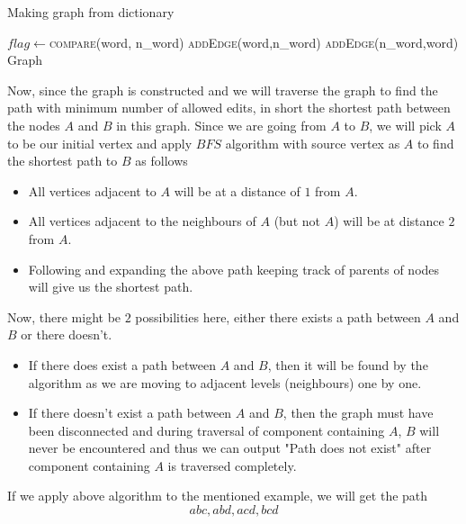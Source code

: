 \documentclass{article}
\begin{document}
{\begin{algorithm}
    \caption{Making graph from dictionary}
    \begin{algorithmic}[1]
            \State $flag \gets$\textsc{compare}(word, n\_word)
              \State \textsc{addEdge}(word,n\_word)
              \State \textsc{addEdge}(n\_word,word)
            \EndIf
          \EndFor
        \EndFor
        \State \Return Graph
      \EndProcedure
    \end{algorithmic}
  \end{algorithm}
  \newpage
  \noindent Now, since the graph is constructed and we will traverse the graph to find the path with minimum number of allowed edits, in short the shortest path between the nodes $A$ and $B$ in this graph. \newline
  Since we are going from $A$ to $B$, we will pick $A$ to be our initial vertex and apply $BFS$ algorithm with source vertex as $A$ to find the shortest path to $B$ as follows
  \begin{itemize}
    \item{All vertices adjacent to $A$ will be at a distance of $1$ from $A$.}
    \item{All vertices adjacent to the neighbours of $A$ (but not $A$) will be at distance $2$ from $A$.}
    \item{Following and expanding the above path keeping track of parents of nodes will give us the shortest path.}
  \end{itemize}
  Now, there might be $2$ possibilities here, either there exists a path between $A$ and $B$ or there doesn't.
  \begin{itemize}
    \item{If there does exist a path between $A$ and $B$, then it will be found by the algorithm as we are moving to adjacent levels (neighbours) one by one.}
    \item{If there doesn't exist a path between $A$ and $B$, then the graph must have been disconnected and during traversal of component containing $A$, $B$ will never be encountered and thus we can output "Path does not exist" after component containing $A$ is traversed completely.}
  \end{itemize}
  If we apply above algorithm to the mentioned example, we will get the path $$abc, abd, acd, bcd$$
}
\end{document}
